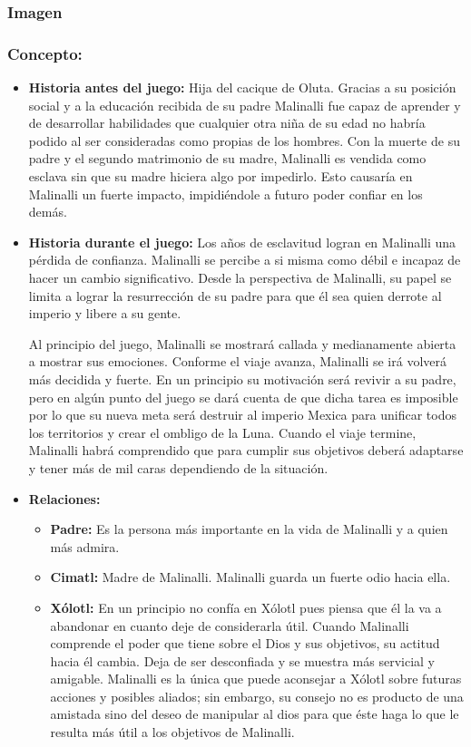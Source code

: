 \documentclass[11pt,letterpaper]{article}
\begin{document}
\subsubsection{Imagen}
\subsubsection{Concepto:}
\begin{itemize}
	\item \textbf{Historia antes del juego:}
	Hija del cacique de Oluta. Gracias a su posición social y a la educación recibida de su padre Malinalli fue capaz de aprender y de desarrollar habilidades que cualquier otra niña de su edad no habría podido al ser consideradas como propias de los hombres. Con la muerte de su padre y el segundo matrimonio de su madre, Malinalli es vendida como esclava sin que su madre hiciera algo por impedirlo. Esto causaría en Malinalli un fuerte impacto, impidiéndole a futuro poder confiar en los demás.
	\item \textbf{Historia durante el juego:}
	Los años de esclavitud logran en Malinalli una pérdida de confianza. Malinalli se percibe a si misma como débil e incapaz de hacer un cambio significativo. Desde la perspectiva de Malinalli, su papel se limita a lograr la resurrección de su padre para que él sea quien derrote al imperio y libere a su gente.
	\\
	\par 
	Al principio del juego, Malinalli se mostrará callada y medianamente abierta a mostrar sus emociones. Conforme el viaje avanza, Malinalli se irá volverá más decidida y fuerte. En un principio su motivación será revivir a su padre, pero en algún punto del juego se dará cuenta de que dicha tarea es imposible por lo que su nueva meta será destruir al imperio Mexica para unificar todos los territorios y crear el ombligo de la Luna. Cuando el viaje termine, Malinalli habrá comprendido que para cumplir sus objetivos deberá adaptarse y tener más de mil caras dependiendo de la situación.
	
	\item \textbf{Relaciones:}
	\begin{itemize}
		\item \textbf{Padre:} Es la persona más importante en la vida de Malinalli y a quien más admira.
		\item \textbf{Cimatl: } Madre de Malinalli. Malinalli guarda un fuerte odio hacia ella.
		\item \textbf{Xólotl:} En un principio no confía en Xólotl pues piensa que él la va a abandonar en cuanto deje de considerarla útil. Cuando Malinalli comprende el poder que tiene sobre el Dios y sus objetivos, su actitud hacia él cambia. Deja de ser desconfiada y se muestra más servicial y amigable. Malinalli es la única que puede aconsejar a Xólotl sobre futuras acciones y posibles aliados; sin embargo, su consejo no es producto de una amistada sino del deseo de manipular al dios para que éste haga lo que le resulta más útil a los objetivos de Malinalli. 
	\end{itemize}			  
\end{itemize}
\end{document}
